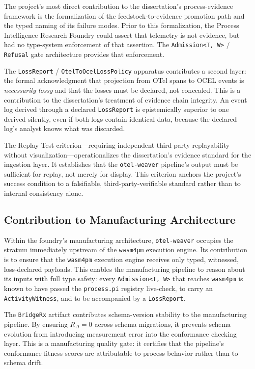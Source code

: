 The project's most direct contribution to the dissertation's process-evidence framework is the
formalization of the feedstock-to-evidence promotion path and the typed naming of its failure
modes. Prior to this formalization, the Process Intelligence Research Foundry could assert that
telemetry is not evidence, but had no type-system enforcement of that assertion. The
\texttt{Admission<T,\,W>} / \texttt{Refusal} gate architecture provides that enforcement.

The \texttt{LossReport} / \texttt{OtelToOcelLossPolicy} apparatus contributes a second layer:
the formal acknowledgment that projection from OTel spans to OCEL events is \emph{necessarily
lossy} and that the losses must be declared, not concealed. This is a contribution to the
dissertation's treatment of evidence chain integrity. An event log derived through a declared
\texttt{LossReport} is epistemically superior to one derived silently, even if both logs contain
identical data, because the declared log's analyst knows what was discarded.

The Replay Test criterion---requiring independent third-party replayability without
visualization---operationalizes the dissertation's evidence standard for the ingestion layer.
It establishes that the \texttt{otel-weaver} pipeline's output must be sufficient for replay,
not merely for display. This criterion anchors the project's success condition to a
falsifiable, third-party-verifiable standard rather than to internal consistency alone.

\subsection{Contribution to Manufacturing Architecture}
\label{sec:otel-weaver-contribution-manufacturing}

Within the foundry's manufacturing architecture, \texttt{otel-weaver} occupies the stratum
immediately upstream of the \texttt{wasm4pm} execution engine. Its contribution is to ensure
that the \texttt{wasm4pm} execution engine receives only typed, witnessed, loss-declared payloads.
This enables the manufacturing pipeline to reason about its inputs with full type safety: every
\texttt{Admission<T,\,W>} that reaches \texttt{wasm4pm} is known to have passed the
\texttt{process.pi} registry live-check, to carry an \texttt{ActivityWitness}, and to be
accompanied by a \texttt{LossReport}.

The \texttt{BridgeRx} artifact contributes schema-version stability to the manufacturing pipeline.
By ensuring $R_\Delta = 0$ across schema migrations, it prevents schema evolution from
introducing measurement error into the conformance checking layer. This is a manufacturing
quality gate: it certifies that the pipeline's conformance fitness scores are attributable to
process behavior rather than to schema drift.

